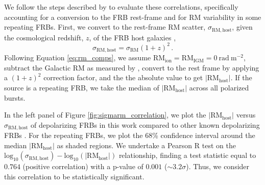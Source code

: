 \documentclass[twocolumn, linenumbers]{aastex701}
\begin{document}
We follow the steps described by \cite{2026ApJ..1000L..53P} to evaluate these correlations, specifically accounting for a conversion to the FRB rest-frame and for RM variability in some repeating FRBs. First, we convert to the rest-frame RM scatter, $\sigma_\mathrm{RM,host}$, given the cosmological redshift, $z$, of the FRB host galaxies \citep{2024MNRAS.528.2511T},
\begin{equation}
\sigma_\mathrm{RM,host} = \sigma_\mathrm{RM} (1+z)^2\,. \label{eq:sigma_rm_host}
\end{equation}
Following Equation \ref{eq:rm_comps}, we assume $\mathrm{RM}_\mathrm{ion} = \mathrm{RM}_\mathrm{IGM} = 0~\mathrm{rad}~\mathrm{m}^{-2}$, subtract the Galactic RM as measured by \cite{2022A&A...657A..43H}, convert to the rest frame by applying a $(1+z)^2$ correction factor, and the the absolute value to get $|\mathrm{RM}_\mathrm{host}|$. If the source is a repeating FRB, we take the median of $|\mathrm{RM}_\mathrm{host}|$ across all polarized bursts.

In the left panel of Figure \ref{fig:sigmarm_correlation}, we plot the $|\mathrm{RM}_\mathrm{host}|$ versus $\sigma_\mathrm{RM,host}$ of depolarizing FRBs in this work compared to other known depolarizing FRBs \citep{2022Sci...375.1266F, 2025MNRAS.tmp.1894U, 2026ApJ..1000L..53P}. For the repeating FRBs, we plot the 68\% confidence interval around the median $|\mathrm{RM}_\mathrm{host}|$ as shaded regions. We undertake a Pearson R test on the $\mathrm{log}_{10}(\sigma_\mathrm{RM,host})-\mathrm{log}_{10}(|\mathrm{RM}_\mathrm{host}|)$ relationship, finding a test statistic equal to $0.764$ (positive correlation) with a p-value of $0.001$ ($\sim 3.2 \sigma$). Thus, we consider this correlation to be statistically significant.
\end{document}
